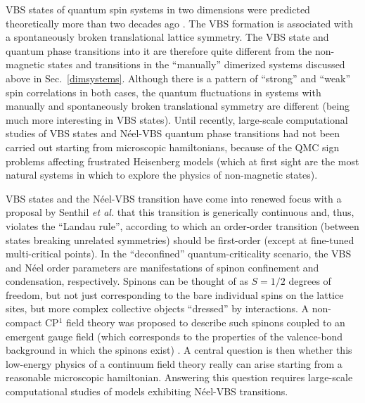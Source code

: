 \documentclass[draft,numberedheadings]{aipproc}
\begin{document}
VBS states of quantum spin systems in two dimensions were predicted theoretically more than two decades ago \cite{read}. The VBS formation is associated with a 
spontaneously broken translational lattice symmetry. The VBS state and quantum phase transitions into it are therefore quite different from the non-magnetic 
states and transitions in the ``manually'' dimerized systems discussed above in Sec.~\ref{dimsystems}. Although there is a pattern of ``strong'' and ``weak'' 
spin correlations in both cases, the quantum fluctuations in systems with manually and spontaneously broken translational symmetry are different (being much 
more interesting in VBS states). Until recently, large-scale computational studies of VBS states and N\'eel-VBS quantum phase transitions had not been carried 
out starting from microscopic hamiltonians, because of the QMC sign problems affecting frustrated Heisenberg models (which at first sight are the most natural 
systems in which to explore the physics of non-magnetic states). 

VBS states and the N\'eel-VBS transition have come into renewed focus with a proposal by Senthil {\it et al.} \cite{senthil1} that this transition is 
generically continuous and, thus, violates the ``Landau rule'', according to which an order-order transition (between states breaking unrelated symmetries) 
should be first-order (except at fine-tuned multi-critical points). In the ``deconfined'' quantum-criticality scenario, the VBS and N\'eel order parameters 
are manifestations of spinon confinement and condensation, respectively. Spinons can be thought of as $S=1/2$ degrees of freedom, but not just corresponding 
to the bare individual spins on the lattice sites, but more complex collective objects ``dressed'' by interactions. A non-compact CP$^1$ field theory was 
proposed to describe such spinons coupled to an emergent gauge field (which corresponds to the properties of the valence-bond background in which the spinons 
exist) \cite{senthil1}. A central question is then whether this low-energy physics of a continuum field theory really can arise starting from a reasonable 
microscopic hamiltonian. Answering this question requires large-scale computational studies of models exhibiting N\'eel-VBS transitions.
\end{document}
